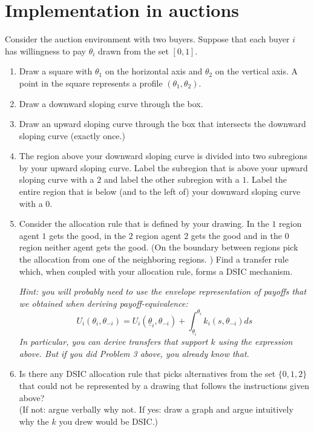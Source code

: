 \documentclass[a4paper]{article}
\begin{document}
\section{Implementation in auctions}

	Consider the auction environment with two buyers.  Suppose that each buyer $i$ has willingness to pay $\theta_i$ drawn from the set $[0,1].$
	\begin{enumerate}
		\item Draw a square with $\theta_1$ on the horizontal axis and $\theta_2$ on the vertical axis.  A point in the square
		represents a profile $(\theta_1, \theta_2)$.
		\item Draw a downward sloping curve through the box.
		\item Draw an upward sloping curve through the box that intersects the downward sloping curve (exactly once.)
		\item The region above your downward sloping curve is divided into two subregions by your upward sloping curve.  Label
		the subregion that is above your upward sloping curve with a $2$ and label the other subregion with a $1$.  Label
		the entire region that is below (and to the left of) your downward sloping curve with a $0$.
		\item Consider the allocation rule that is defined by your drawing.  In the $1$ region agent $1$ gets the
		good, in the $2$ region agent $2$ gets the good and in the $0$ region neither agent gets the good.  (On the boundary
		between regions pick the allocation from one of the neighboring regions. )  Find a transfer rule which, when
		coupled with your allocation rule, forms a DSIC mechanism.
		
		\emph{Hint: you will probably need to use the envelope representation of payoffs that we obtained when deriving payoff-equivalence:}
		\begin{equation*}
			U_i(\theta_i, \theta_{-i}) = U_i (\underline{\theta}_i,\theta_{-i}) + \int_{\underline{\theta}_i}^{\theta_i} k_i(s,\theta_{-i}) d s
		\end{equation*}
		\emph{In particular, you can derive transfers that support $k$ using the expression above. But if you did Problem 3 above, you already know that.}
		
		\item Is there any DSIC allocation rule that picks alternatives from the set $\{0,1,2\}$ that could not be represented by a drawing that follows the instructions given above?
		\\
		(If not: argue verbally why not. If yes: draw a graph and argue intuitively why the $k$ you drew would be DSIC.)
	\end{enumerate}
\end{document}
